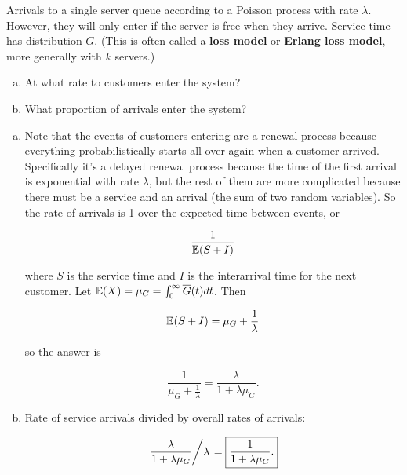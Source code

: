\begin{example}Arrivals to a single server queue according to a Poisson process with rate \(\lambda\). However, they will only enter if the server is free when they arrive. Service time has distribution \(G\). (This is often called a \textbf{loss model} or \textbf{Erlang loss model}, more generally with \(k\) servers.) 

\begin{enumerate}[(a)]

\item At what rate to customers enter the system?

\item What proportion of arrivals enter the system?

\end{enumerate}

\begin{solution}

\begin{enumerate}[(a)]

\item Note that the events of customers entering are a renewal process because everything probabilistically starts all over again when a customer arrived. Specifically it's a delayed renewal process because the time of the first arrival is exponential with rate \(\lambda\), but the rest of them are more complicated because there must be a service and an arrival (the sum of two random variables). So the rate of arrivals is 1 over the expected time between events, or

\[
\frac{1}{\E(S + I)}
\]

where \(S\) is the service time and \(I\) is the interarrival time for the next customer. Let \(\E(X) = \mu_G = \int_0^\infty \overline{G}(t) dt \). Then

\[
\E(S + I) = \mu_G + \frac{1}{\lambda}
\]

so the answer is

\[
\frac{1}{\mu_G + \frac{1}{\lambda}} = \boxed{ \frac{\lambda}{1 + \lambda \mu_G}.}
\]

\item Rate of service arrivals divided by overall rates of arrivals:

\[
\left.  \frac{\lambda}{1 + \lambda \mu_G} \middle/ \lambda \right. = \boxed{ \frac{1}{1 + \lambda \mu_G}.}
\]

\end{enumerate}

\end{solution}

\end{example}

